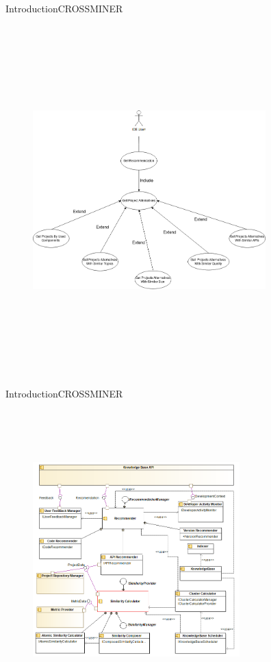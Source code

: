 \documentclass{beamer}
\begin{document}
\begin{frame}{Introduction}{CROSSMINER}
	\begin{figure}[!h]
	\includegraphics[width=9cm,height=13.5cm,keepaspectratio]{images/UseCaseDiagram.png}
	\centering
	\label{fig:UseCaseDiagram}
	\end{figure}
\end{frame}

\begin{frame}{Introduction}{CROSSMINER}
	\begin{figure}[!h]
	\includegraphics[width=8cm,height=11.5cm,keepaspectratio]{images/component.png}
	\centering
	\label{fig:ComponentDiagram}
	\end{figure}
\end{frame}
\end{document}
